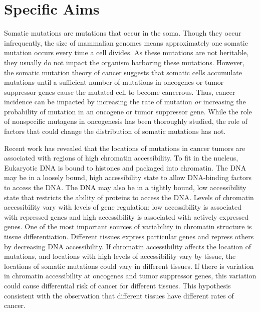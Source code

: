 \documentclass[12pt]{article}
\begin{document}
\section{Specific Aims} %

Somatic mutations are mutations that occur in the soma.
Though they occur infrequently, the size of mammalian genomes means approximately one somatic mutation occurs every time a cell divides.
As these mutations are not heritable, they usually do not impact the organism harboring these mutations.
However, the somatic mutation theory of cancer suggests that somatic cells accumulate mutations until a sufficient number of mutations in oncogenes or tumor suppressor genes cause the mutated cell to become cancerous.
Thus, cancer incidence can be impacted by increasing the rate of mutation \textit{or} increasing the probability of mutation in an oncogene or tumor suppressor gene.
While the role of nonspecific mutagens in oncogenesis has been thoroughly studied, the role of factors that could change the distribution of somatic mutations has not.

Recent work has revealed that the locations of mutations in cancer tumors are associated with regions of high chromatin accessibility.
To fit in the nucleus, Eukaryotic DNA is bound to histones and packaged into chromatin.
The DNA may be in a loosely bound, high accessibility state to allow DNA-binding factors to access the DNA.
The DNA may also be in a tightly bound, low accessibility state that restricts the ability of proteins to access the DNA.
Levels of chromatin accessibility vary with levels of gene regulation; low accessibility is associated with repressed genes and high accessibility is associated with actively expressed genes.
One of the most important sources of variability in chromatin structure is tissue differentiation.
Different tissues express particular genes and repress others by decreasing DNA accessibility.
If chromatin accessibility affects the location of mutations, and locations with high levels of accessibility vary by tissue, the locations of somatic mutations could vary in different tissues.
If there is variation in chromatin accessibility at oncogenes and tumor suppressor genes, this variation could cause differential risk of cancer for different tissues.
This hypothesis consistent with the observation that different tissues have different rates of cancer.
\end{document}
